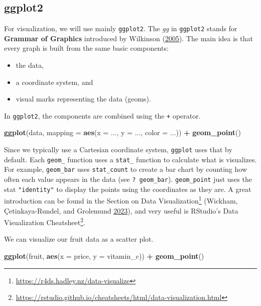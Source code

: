 \documentclass[
  notitlepage]{book}
\newenvironment{Shaded}{\begin{snugshade}}{\end{snugshade}}
\newcommand{\DataTypeTok}[1]{\textcolor[rgb]{0.13,0.29,0.53}{#1}}
\newcommand{\KeywordTok}[1]{\textcolor[rgb]{0.13,0.29,0.53}{\textbf{#1}}}
\newcommand{\NormalTok}[1]{#1}
\newcommand{\OperatorTok}[1]{\textcolor[rgb]{0.81,0.36,0.00}{\textbf{#1}}}
\newcommand{\StringTok}[1]{\textcolor[rgb]{0.31,0.60,0.02}{#1}}
\DeclareRobustCommand{\href}[2]{#2\footnote{\url{#1}}}
\providecommand{\tightlist}{%
  \setlength{\itemsep}{0pt}\setlength{\parskip}{0pt}}
\begin{document}
\hypertarget{ggplot2}{%
\subsection{ggplot2}\label{ggplot2}}

For visualization, we will use mainly \texttt{ggplot2}. The \emph{gg} in \texttt{ggplot2}
stands for \textbf{Grammar of Graphics} introduced by Wilkinson (\protect\hyperlink{ref-Wilkinson2005}{2005}). The
main idea is that every graph is built from the same basic components:

\begin{itemize}
\tightlist
\item
  the data,
\item
  a coordinate system, and
\item
  visual marks representing the data (geoms).
\end{itemize}

In \texttt{ggplot2}, the components are combined using the \texttt{+} operator.

\begin{Shaded}
\begin{Highlighting}[]
\KeywordTok{ggplot}\NormalTok{(data, }\DataTypeTok{mapping =} \KeywordTok{aes}\NormalTok{(}\DataTypeTok{x =}\NormalTok{ ..., }\DataTypeTok{y =}\NormalTok{ ..., }\DataTypeTok{color =}\NormalTok{ ...)) }\OperatorTok{+}
\StringTok{  }\KeywordTok{geom\_point}\NormalTok{()}
\end{Highlighting}
\end{Shaded}

Since we typically use a Cartesian coordinate system, \texttt{ggplot} uses that
by default. Each \texttt{geom\_} function uses a \texttt{stat\_} function to calculate
what is visualizes. For example, \texttt{geom\_bar} uses \texttt{stat\_count} to create
a bar chart by counting how often each value appears in the data (see
\texttt{?\ geom\_bar}). \texttt{geom\_point} just uses the stat \texttt{"identity"} to display
the points using the coordinates as they are. A great introduction can
be found in the \href{https://r4ds.hadley.nz/data-visualize}{Section on Data
Visualization} (Wickham, Çetinkaya-Rundel, and Grolemund \protect\hyperlink{ref-Wickham2023}{2023}),
and very useful is \href{https://rstudio.github.io/cheatsheets/html/data-visualization.html}{RStudio's Data Visualization Cheatsheet}.

We can visualize our fruit data as a scatter plot.

\begin{Shaded}
\begin{Highlighting}[]
\KeywordTok{ggplot}\NormalTok{(fruit, }\KeywordTok{aes}\NormalTok{(}\DataTypeTok{x =}\NormalTok{ price, }\DataTypeTok{y =}\NormalTok{ vitamin\_c)) }\OperatorTok{+}\StringTok{ }
\StringTok{  }\KeywordTok{geom\_point}\NormalTok{()}
\end{Highlighting}
\end{Shaded}
\end{document}
